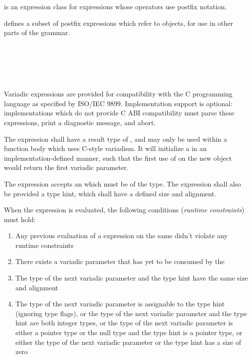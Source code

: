 \specsubsubitem
{} is an expression class for expressions whose
operators use postfix notation.

\specsubsubitem
{} defines a subset of postfix expressions which
refer to objects, for use in other parts of the grammar.


\begin{grammar}
 \\
	 \terminal{(} \terminal{)} \\
	 \terminal{(}  \terminal{)} \\
	 \terminal{(}  \terminal{)} \\
\end{grammar}

\specsubsubitem
Variadic expressions are provided for compatibility with the C programming
language as specified by ISO/IEC 9899. Implementation support is optional:
implementations which do not provide C ABI compatibility must parse these
expressions, print a diagnostic message, and abort.


\specsubsubitem
The  expression shall have a result type of
, and may only be used within a function body which uses
C-style variadism. It will initialize a  in an
implementation-defined manner, such that the first use of  on
the new object would return the first variadic parameter.

\specsubsubitem
The  expression accepts an  which
must be of the  type. The expression shall also be provided a
type hint, which shall have a defined size and alignment.

\specsubsubitem
When the  expression is evaluated, the following conditions
(\textit{runtime constraints}) must hold:

\begin{enumerate}
\item Any previous evaluation of a  expression on the same
	 didn't violate any runtime constraints
\item There exists a variadic parameter that has yet to be consumed by the
\item The type of the next variadic parameter and the type hint have the same
	size and alignment
\item The type of the next variadic parameter is assignable to the type hint
	(ignoring type flags), or the type of the next variadic parameter and
	the type hint are both integer types, or the type of the next variadic
	parameter is either a pointer type or the null type and the type hint is
	a pointer type, or either the type of the next variadic parameter or the
	type hint has a size of zero
\end{enumerate}

